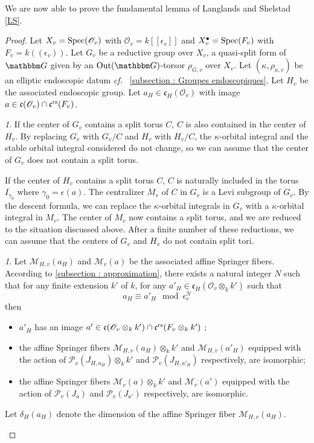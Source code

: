 \documentclass[12pt,english]{smfart}
\numberwithin{equation}{subsection}
\theoremstyle{remark}
\newtheorem{numero}[equation]{}
\newcommand\calP{{\mathscr P}}
\newcommand\calM{{\mathscr M}}
\newcommand\calO{{\mathscr O}}
\newcommand\frakc{{\mathfrak c}}
\newcommand\GG{{\mathbbm G}}
\newcommand\Spec{{\rm Spec}}
\newcommand\Out{{\rm Out}}
\newcommand\cf{{\it cf.\ }}
\newcommand\rs{{\rm rs}}
\begin{document}
We are now able to prove the fundamental lemma of
Langlands and Shelstad \ref{LS}.

\begin{proof}
Let $X_v=\Spec(\calO_v)$ with $\calO_v=k[[\epsilon_v]]$ and
$X_v^\bullet=\Spec(F_v)$ with $F_v=k((\epsilon_v))$. Let $G_v$ be a
reductive group over $X_v$, a quasi-split form of $\GG$ given by
an $\Out(\GG)$-torsor $\rho_{G,v}$ over $X_v$. Let
$(\kappa,\rho_{\kappa,v})$ be an elliptic endoscopic datum \cf
\ref{subsection : Groupes endoscopiques}. Let $H_v$ be the associated
endoscopic group. Let $a_H\in \frakc_{H}(\calO_v)$ with image $a\in
\frakc(\calO_v)\cap \frakc^\rs(F_v)$.

\begin{numero}
If the center of $G_v$ contains a split torus $C$, $C$ is also
contained in the center of $H_v$. By replacing $G_v$ with $G_v/C$ and
$H_v$ with $H_v/C$, the $\kappa$-orbital integral and the stable orbital
integral considered do not change, so we can assume that the
center of $G_v$ does not contain a split torus.

If the center of $H_v$ contains a split torus $C$, $C$ is
naturally included in the torus $I_{\gamma_0}$ where
$\gamma_0=\epsilon(a)$. The centralizer $M_v$ of $C$ in $G_v$ is a
Levi subgroup of $G_v$. By the descent formula, we can
replace the $\kappa$-orbital integrals in $G_v$ with a
$\kappa$-orbital integral in $M_v$. The center of $M_v$ now contains
a split torus, and we are reduced to the situation discussed
above. After a finite number of these reductions, we can assume that
the centers of $G_v$ and $H_v$ do not contain split tori.
\end{numero}

\begin{numero}
Let $\calM_{H,v}(a_H)$ and $\calM_v(a)$ be the associated affine Springer
fibers. According to \ref{subsection : approximation}, there exists a natural
integer $N$ such that for any finite extension $k'$ of $k$, for any $a'_H
\in \frakc_H(\calO_v\otimes_k k')$ such that
$$a_H \equiv a'_H \mod \epsilon_v^N$$
then
\begin{itemize}
 \item $a'_H$ has an image $a'\in \frakc(\calO_v\otimes_k k')\cap
   \frakc^\rs(F_v\otimes_k k')$ ;
 \item the affine Springer fibers $\calM_{H,v}(a_H)\otimes_k k'$ and
   $\calM_{H,v}(a'_H)$ equipped with the action of
   $\calP_{v}(J_{H,a_H})\otimes_k k'$ and $\calP_v(J_{H,a'_H})$
   respectively, are isomorphic;
 \item the affine Springer fibers $\calM_v(a)\otimes_k k'$ and
   $\calM_v(a')$ equipped with the action of $\calP_v(J_a)$ and
   $\calP_v(J_{a'})$ respectively, are isomorphic.
\end{itemize}
Let $\delta_H(a_H)$ denote the dimension of the affine Springer fiber
$\calM_{H,v}(a_H)$.
\end{numero}


\end{proof}
\end{document}
